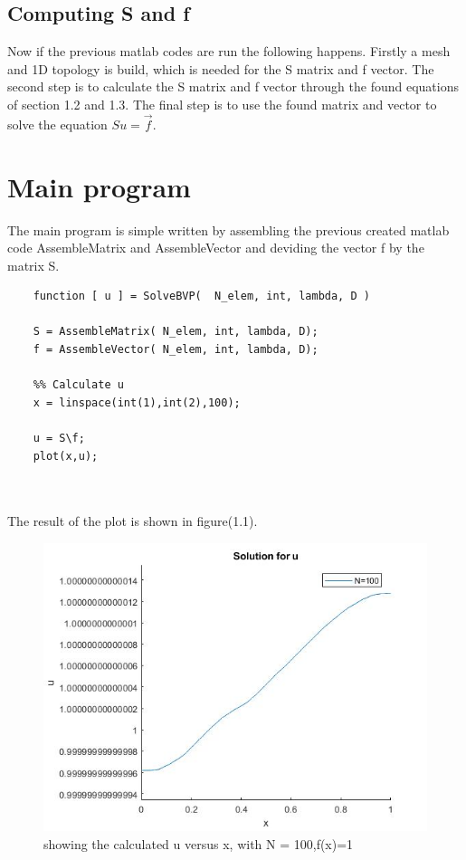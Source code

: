 \documentclass[a4paper]{report}
\begin{document}
\subsection{Computing S and f}

Now if the previous matlab codes are run the following happens. Firstly a mesh and 1D topology is build, which is needed for the S matrix and f vector. The second step is to calculate the S matrix and f vector through the found equations of section 1.2 and 1.3. The final step is to use the found matrix and vector to solve the equation $Su=\vec{f}$.





\section{Main program}

The main program is simple written by assembling the previous created matlab code AssembleMatrix and AssembleVector and deviding the vector f by the matrix S.
\begin{lstlisting}
	function [ u ] = SolveBVP(  N_elem, int, lambda, D )
	
	S = AssembleMatrix( N_elem, int, lambda, D);
	f = AssembleVector( N_elem, int, lambda, D);
	
	%% Calculate u
	x = linspace(int(1),int(2),100);
	
	u = S\f;
	plot(x,u); 
	
	
\end{lstlisting}
The result of the plot is shown in figure(1.1).

\begin{figure}[ht!]
	\centering
	\includegraphics[width=150mm]{1Df1.jpg}
	\caption{showing the calculated u versus x, with N = 100,f(x)=1 \label{overflow}}
\end{figure}
\end{document}

